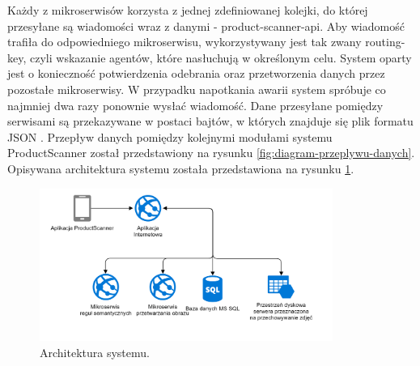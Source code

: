 {Każdy z mikroserwisów korzysta z jednej zdefiniowanej kolejki, do której przesyłane są wiadomości wraz z danymi - product-scanner-api. Aby wiadomość trafiła do odpowiedniego mikroserwisu, wykorzystywany jest tak zwany routing-key, czyli wskazanie agentów, które nasłuchują w określonym celu. System oparty jest o konieczność potwierdzenia odebrania oraz przetworzenia danych przez pozostałe mikroserwisy. W przypadku napotkania awarii system spróbuje co najmniej dwa razy ponownie wysłać wiadomość. Dane przesyłane pomiędzy serwisami są przekazywane w postaci bajtów, w których znajduje się plik formatu JSON \cite{JSON}. Przepływ danych pomiędzy kolejnymi modułami systemu ProductScanner został przedstawiony na rysunku \ref{fig:diagram-przeplywu-danych}. Opisywana architektura systemu została przedstawiona na rysunku \ref{fig:sysArchitecture}.
\begin{figure}[h]
	\centering
	\includegraphics[width=0.7\linewidth, height=5cm]{images/architecture}
	\caption{Architektura systemu.}
	\label{fig:sysArchitecture}
\end{figure}
}
	
	
